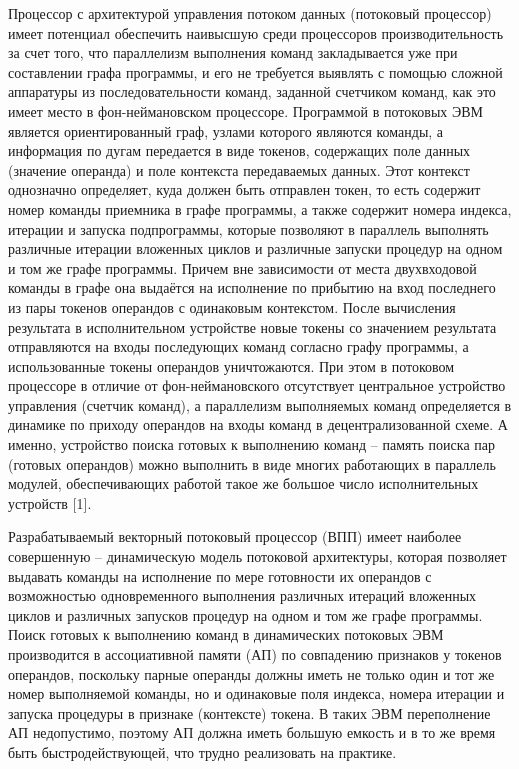 \documentclass[
11pt,%
tightenlines,%
twoside,%
onecolumn,%
nofloats,%
nobibnotes,%
nofootinbib,%
superscriptaddress,%
noshowpacs,%
centertags]%
{revtex4}
\begin{document}
Процессор с архитектурой управления потоком данных (потоковый процессор) имеет потенциал обеспечить наивысшую среди процессоров производительность за счет того, что параллелизм выполнения команд закладывается уже при составлении графа программы, и его не требуется выявлять с помощью сложной аппаратуры из последовательности команд, заданной счетчиком команд, как это имеет место в фон-неймановском процессоре. Программой в потоковых ЭВМ является ориентированный граф, узлами которого являются команды, а информация по дугам передается в виде токенов, содержащих поле данных (значение операнда) и поле контекста передаваемых данных. Этот контекст однозначно определяет, куда должен быть отправлен токен, то есть содержит номер команды приемника в графе программы, а также содержит номера индекса, итерации и запуска подпрограммы, которые позволяют в параллель выполнять различные итерации вложенных циклов и различные запуски процедур на одном и том же графе программы. Причем вне зависимости от места двухвходовой команды в графе она выдаётся на исполнение по прибытию на вход последнего из пары токенов операндов с одинаковым контекстом. После вычисления результата в исполнительном устройстве новые токены со значением результата отправляются на входы последующих команд согласно графу программы, а использованные токены операндов уничтожаются. При этом в потоковом процессоре в отличие от фон-неймановского отсутствует центральное устройство управления (счетчик команд), а параллелизм выполняемых команд определяется в динамике по приходу операндов на входы команд в децентрализованной схеме. А именно, устройство поиска готовых к выполнению команд – память поиска пар (готовых операндов) можно выполнить в виде многих работающих в параллель модулей, обеспечивающих работой такое же большое число исполнительных устройств [1].

Разрабатываемый векторный потоковый процессор (ВПП) имеет наиболее совершенную – динамическую модель потоковой архитектуры, которая позволяет выдавать команды на исполнение по мере готовности их операндов с возможностью одновременного выполнения различных итераций вложенных циклов и различных запусков процедур на одном и том же графе программы. Поиск готовых к выполнению команд в динамических потоковых ЭВМ производится в ассоциативной памяти (АП) по совпадению признаков у токенов операндов, поскольку парные операнды должны иметь не только один и тот же номер выполняемой команды, но и одинаковые поля индекса, номера итерации и запуска процедуры в признаке (контексте) токена. В таких ЭВМ переполнение АП недопустимо, поэтому АП должна иметь большую емкость и в то же время быть быстродействующей, что трудно реализовать на практике.
\end{document}
